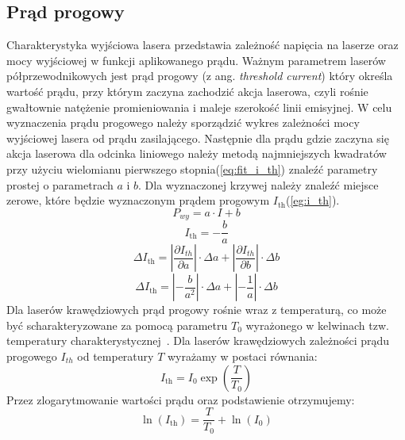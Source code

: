 \subsection{Prąd progowy}
Charakterystyka wyjściowa lasera przedstawia zależność napięcia na laserze oraz mocy wyjściowej w funkcji aplikowanego prądu.
Ważnym parametrem laserów półprzewodnikowych jest prąd progowy (z ang. \textit{threshold
current}) który określa wartość prądu, przy którym zaczyna zachodzić akcja laserowa, czyli
rośnie gwałtownie natężenie promieniowania i maleje szerokość linii emisyjnej. W celu wyznaczenia prądu progowego należy
sporządzić wykres zależności mocy wyjściowej lasera od prądu zasilającego. Następnie dla prądu gdzie zaczyna się akcja
laserowa dla odcinka liniowego należy metodą najmniejszych kwadratów przy użyciu wielomianu pierwszego stopnia(\ref{eq:fit_i_th})
znaleźć parametry prostej o parametrach $a$ i $b$.
Dla wyznaczonej krzywej należy znaleźć miejsce zerowe, które będzie wyznaczonym prądem progowym $I_{\mathrm{th}}$(\ref{eg:i_th}).
\begin{equation}
\label{eq:fit_i_th}
P_{wy} = a \cdot I + b
\end{equation}
\begin{equation}
\label{eg:i_th}
I_{\mathrm{th}} = -\frac{b}{a}
\end{equation}
\begin{equation}
\Delta I_{\mathrm{th}} = \left\lvert \frac{\partial I_{th}}{\partial a} \right\rvert \cdot \Delta a + \left\lvert \frac{\partial I_{th}}{\partial b} \right\rvert \cdot \Delta b
\end{equation}
\begin{equation}
\Delta I_{\mathrm{th}} = \left\lvert -\frac{b}{a^2} \right\rvert \cdot \Delta a + \left\lvert -\frac{1}{a} \right\rvert \cdot \Delta b
\end{equation}
Dla laserów krawędziowych prąd progowy rośnie wraz z temperaturą, co może być scharakteryzowane za pomocą parametru
$T_{0}$ wyrażonego w kelwinach tzw. temperatury charakterystycznej~\cite{opto_book}.
Dla laserów krawędziowych zależności prądu progowego $I_{th}$ od temperatury $T$ wyrażamy w postaci równania:
\begin{equation}
\label{eq:i_th}
I_{\mathrm{th}} = I_0 \exp \left( \frac{T}{T_0} \right)
\end{equation}
Przez zlogarytmowanie wartości prądu oraz podstawienie otrzymujemy:
\begin{equation}
\ln(I_{\mathrm{th}}) =    \frac{T}{T_0}  + \ln(I_0)
\end{equation}
